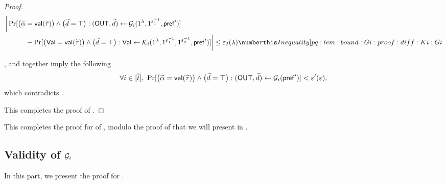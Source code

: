 \begin{proof}

\begin{align*}
&  \bigg| \Pr[\big(\tilde{\alpha} = \msf{val}(\tilde{\tau})\big) \wedge \big(\tilde{d} = \top \big) :(\OUT,\tilde{d}) \gets \mcal{G}_i(1^\secpar, 1^{\epsilon_1^{-1}},  \msf{pref}')] \\ 
 &\hspace{3em} - 
 \Pr[\big(\Val = \msf{val}(\tilde{\tau})\big) \wedge \big(\tilde{d} = \top \big) :\Val \gets \mcal{K}_i(1^\secpar, 1^{\epsilon_1^{-1}}, 1^{\epsilon_2^{-1}}, \msf{pref}')] \bigg| \leq \epsilon_2(\secpar) \numberthis \label[Inequality]{pq:lem:bound:Gi:proof:diff:Ki:Gi}
\end{align*}

 , and  together imply the following
$$
    \forall i \in [\tilde{t}],\ \Pr[\big(\tilde{\alpha} = \msf{val}( \tilde{\tau}) \big) \wedge \big(\tilde{d} = \top\big) :(\OUT,\tilde{d}) \gets \mcal{G}_i(\msf{pref'})] <  {\epsilon'(\epsilon)},
$$
which contradicts .

This completes the proof of .

\end{proof} 

This completes the proof for  of , modulo the proof of  that we will present in .


\subsection{Validity of $\mathcal{G}_i$}
\label{sec:proof:pq:lem:bound:Gi}
In this part, we present the proof for .

